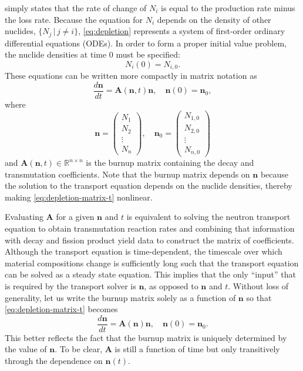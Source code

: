 \documentclass[3p,authoryear]{elsarticle}
\newcommand{\vect}[1]{\mathbf{#1}} %
\begin{document}
 simply states that the rate of change of $N_i$ is equal to
the production rate minus the loss rate. Because the equation for $N_i$ depends
on the density of other nuclides, $\{N_j \,|\, j \ne i\}$, \cref{eq:depletion}
represents a system of first-order ordinary differential equations (ODEs). In
order to form a proper initial value problem, the nuclide densities at time 0
must be specified:
\begin{equation}
    N_i(0) = N_{i,0}.
\end{equation}
These equations can be written more compactly in matrix notation as
\begin{equation}
  \label{eq:depletion-matrix-t}
  \frac{d\vect{n}}{dt} = \vect{A}(\vect{n},t)\vect{n}, \quad \vect{n}(0) =
  \vect{n}_0,
\end{equation}
where
\begin{equation}
  \vect{n} = \begin{pmatrix} N_1 \\ N_2 \\ \vdots \\ N_n \end{pmatrix}, \quad
  \vect{n}_0 = \begin{pmatrix} N_{1,0} \\ N_{2,0} \\ \vdots \\ N_{n,0} \end{pmatrix}
\end{equation}
and $\vect{A}(\vect{n},t) \in \mathbb{R}^{n\times n}$ is the burnup matrix
containing the decay and transmutation coefficients. Note that the burnup matrix
depends on $\vect{n}$ because the solution to the transport equation depends
on the nuclide densities, thereby making \cref{eq:depletion-matrix-t} nonlinear.

Evaluating $\vect{A}$ for a given $\vect{n}$ and $t$ is equivalent to solving
the neutron transport equation to obtain transmutation reaction rates and
combining that information with decay and fission product yield data to
construct the matrix of coefficients. Although the transport equation is
time-dependent, the timescale over which material compositions change is
sufficiently long such that the transport equation can be solved as a steady
state equation. This implies that the only ``input'' that is required by the
transport solver is $\vect{n}$, as opposed to $\vect{n}$ and $t$. Without loss
of generality, let us write the burnup matrix solely as a function of $\vect{n}$
so that \cref{eq:depletion-matrix-t} becomes
\begin{equation}
  \label{eq:depletion-matrix}
  \frac{d\vect{n}}{dt} = \vect{A}(\vect{n})\vect{n}, \quad \vect{n}(0) =
  \vect{n}_0.
\end{equation}
This better reflects the fact that the burnup matrix is uniquely determined by
the value of $\vect{n}$. To be clear, $\vect{A}$ is still a function of time but
only transitively through the dependence on $\vect{n}(t)$.
\end{document}

